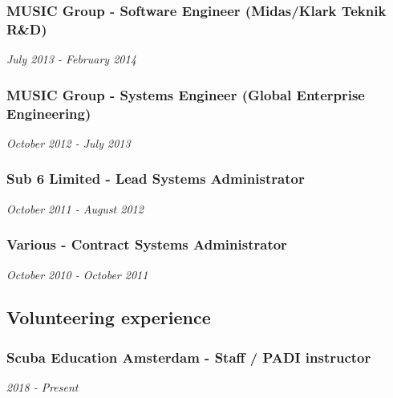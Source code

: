 \hypertarget{music-group---software-engineer-midasklark-teknik-rd}{%
\subsubsection{MUSIC Group - Software Engineer (Midas/Klark Teknik
R\&D)}\label{music-group---software-engineer-midasklark-teknik-rd}}

\emph{July 2013 - February 2014}

\hypertarget{music-group---systems-engineer-global-enterprise-engineering}{%
\subsubsection{MUSIC Group - Systems Engineer (Global Enterprise
Engineering)}\label{music-group---systems-engineer-global-enterprise-engineering}}

\emph{October 2012 - July 2013}

\hypertarget{sub-6-limited---lead-systems-administrator}{%
\subsubsection{Sub 6 Limited - Lead Systems
Administrator}\label{sub-6-limited---lead-systems-administrator}}

\emph{October 2011 - August 2012}

\hypertarget{various---contract-systems-administrator}{%
\subsubsection{Various - Contract Systems
Administrator}\label{various---contract-systems-administrator}}

\emph{October 2010 - October 2011}

\hypertarget{volunteering-experience}{%
\subsection{Volunteering experience}\label{volunteering-experience}}

\hypertarget{scuba-education-amsterdam---staff-padi-instructor}{%
\subsubsection{Scuba Education Amsterdam - Staff / PADI
instructor}\label{scuba-education-amsterdam---staff-padi-instructor}}

\emph{2018 - Present}

